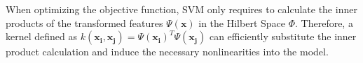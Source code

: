 
When optimizing the objective function, SVM only requires to calculate the inner products of the transformed features $\Psi(\mathbf{x})$ in the Hilbert Space $\Phi$. Therefore, a kernel defined as $k(\mathbf{x_i},\mathbf{x_j}) = \Psi(\mathbf{x_i})^T\Psi(\mathbf{x_j})$ can efficiently substitute the inner product calculation and induce the necessary nonlinearities into the model\cite{evgeniou2000regularization}.









